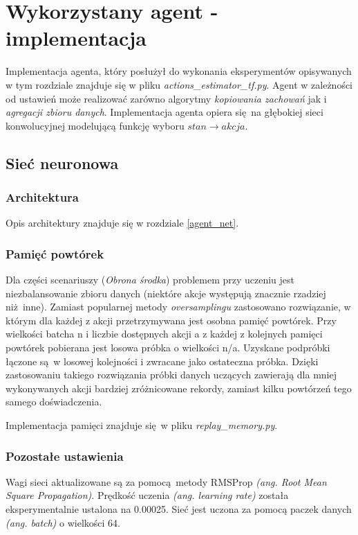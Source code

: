 \section{Wykorzystany agent - implementacja}

Implementacja agenta, który posłużył do wykonania eksperymentów opisywanych w tym rozdziale znajduje się w pliku \textit{actions\_estimator\_tf.py}. Agent w zależności od ustawień może realizować zarówno algorytmy \textit{kopiowania zachowań} jak i \textit{agregacji zbioru danych}. Implementacja agenta opiera się na głębokiej sieci konwolucyjnej modelującą funkcję wyboru $stan \rightarrow akcja$.


\subsection{Sieć neuronowa}

\subsubsection{Architektura}
Opis architektury znajduje się w rozdziale \ref{agent_net}.

\subsubsection{Pamięć powtórek}
Dla części scenariuszy (\textit{Obrona środka}) problemem przy uczeniu jest niezbalansowanie zbioru danych (niektóre akcje występują znacznie rzadziej niż inne). Zamiast popularnej metody \textit{oversamplingu} zastosowano rozwiązanie, w którym dla każdej z akcji przetrzymywana jest osobna pamięć powtórek. Przy wielkości batcha n i liczbie dostępnych akcji a z każdej z kolejnych pamięci powtórek pobierana jest losowa próbka o wielkości n/a. Uzyskane podpróbki łączone są w losowej kolejności i zwracane jako ostateczna próbka. Dzięki zastosowaniu takiego rozwiązania próbki danych uczących zawierają dla mniej wykonywanych akcji bardziej zróżnicowane rekordy, zamiast kilku powtórzeń tego samego doświadczenia.

Implementacja pamięci znajduje się w pliku \textit{replay\_memory.py}.

\subsubsection{Pozostałe ustawienia}

Wagi sieci aktualizowane są za pomocą metody RMSProp \textit{(ang. Root Mean Square Propagation)}. Prędkość uczenia \textit{(ang. learning rate)} została eksperymentalnie ustalona na 0.00025. Sieć jest uczona za pomocą paczek danych \textit{(ang. batch)} o wielkości 64.










